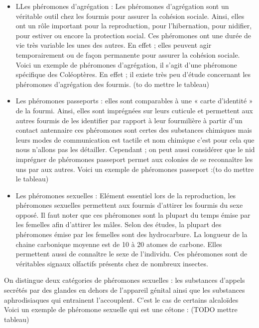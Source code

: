 \begin{itemize}
\item
  LLes phéromones d'agrégation : Les phéromones d'agrégation sont un
  véritable outil chez les fourmis pour assurer la cohésion sociale.
  Ainsi, elles ont un rôle important pour la reproduction, pour
  l'hibernation, pour nidifier, pour estiver ou encore la protection
  social. Ces phéromones ont une durée de vie très variable les unes des
  autres. En effet ; elles peuvent agir temporairement ou de façon
  permanente pour assurer la cohésion sociale. Voici un exemple de
  phéromones d'agrégation, il s'agit d'une phéromone spécifique des
  Coléoptères. En effet ; il existe très peu d'étude concernant les
  phéromones d'agrégation des fourmis. (to do mettre le tableau)
\item
  Les phéromones passeports : elles sont comparables à une « carte
  d'identité » de la fourmi. Ainsi, elles sont imprégnées sur leurs
  cuticule et permettent aux autres fourmis de les identifier par
  rapport à leur fourmilière à partir d'un contact antennaire ces
  phéromones sont certes des substances chimiques mais leurs modes de
  communication est tactile et nom chimique c'est pour cela que nous
  n'allons pas les détailler. Cependant ; on peut aussi considérer que
  le nid imprégner de phéromones passeport permet aux colonies de se
  reconnaître les uns par aux autres. Voici un exemple de phéromones
  passeport :(to do mettre le tableau)
\item
  Les phéromones sexuelles : Elément essentiel lors de la reproduction,
  les phéromones sexuelles permettent aux fourmis d'attirer les fourmis
  du sexe opposé. Il faut noter que ces phéromones sont la plupart du
  temps émise par les femelles afin d'attirer les mâles. Selon des
  études, la plupart des phéromones émise par les femelles sont des
  hydrocarbure. La longueur de la chaine carbonique moyenne est de 10 à
  20 atomes de carbone. Elles permettent aussi de connaître le sexe de
  l'individu. Ces phéromones sont de véritables signaux olfactifs
  présents chez de nombreux insectes.
\end{itemize}

On distingue deux catégories de phéromones sexuelles : les substances
d'appels secrétés par des glandes en dehors de l'appareil génital ainsi
que les substances aphrodisiaques qui entrainent l'accouplent. C'est le
cas de certains alcaloïdes Voici un exemple de phéromone sexuelle qui
est une cétone : (TODO mettre tableau)

